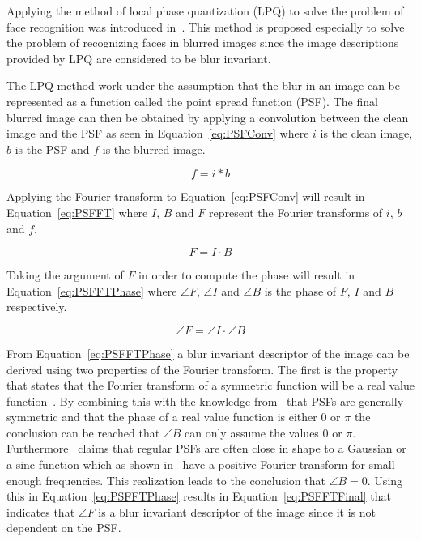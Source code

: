 Applying the method of local phase quantization (LPQ) to solve the problem of face recognition was introduced in~\cite{LPQ:1996}. This method is proposed especially to solve the problem of recognizing faces in blurred images since the image descriptions provided by LPQ are considered to be blur invariant.

The LPQ method work under the assumption that the blur in an image can be represented as a function called the point spread function (PSF). The final blurred image can then be obtained by applying a convolution between the clean image and the PSF as seen in Equation~\ref{eq:PSFConv} where \(i\) is the clean image, \(b\) is the PSF and \(f\) is the blurred image.

\begin{equation}
  f = i \ast b
\label{eq:PSFConv}
\end{equation}

Applying the Fourier transform to Equation~\ref{eq:PSFConv} will result in Equation~\ref{eq:PSFFT} where \(I\), \(B\) and \(F\) represent the Fourier transforms of \(i\), \(b\) and \(f\).

\begin{equation}
  F = I \cdot B
\label{eq:PSFFT}
\end{equation}

Taking the argument of \(F\) in order to compute the phase will result in Equation~\ref{eq:PSFFTPhase} where \(\angle F\), \(\angle I\) and \(\angle B\) is the phase of \(F\), \(I\) and \(B\) respectively.

\begin{equation}
  \angle F = \angle I \cdot \angle B
\label{eq:PSFFTPhase}
\end{equation}

From Equation~\ref{eq:PSFFTPhase} a blur invariant descriptor of the image can be derived using two properties of the Fourier transform. The first is the property that states that the Fourier transform of a symmetric function will be a real value function~\cite[p. 151]{FandLTransforms}. By combining this with the knowledge from~\cite{PSFSymmetry} that PSFs are generally symmetric and that the phase of a real value function is either \(0\) or \(\pi\) the conclusion can be reached that \(\angle B\) can only assume the values \(0\) or \(\pi\). Furthermore~\cite{LPQ:1996} claims that regular PSFs are often close in shape to a Gaussian or a sinc function which as shown in~\cite[p. 144-148]{FandLTransforms} have a positive Fourier transform for small enough frequencies. This realization leads to the conclusion that \(\angle B = 0\). Using this in Equation~\ref{eq:PSFFTPhase} results in Equation~\ref{eq:PSFFTFinal} that indicates that \(\angle F\) is a blur invariant descriptor of the image since it is not dependent on the PSF.

